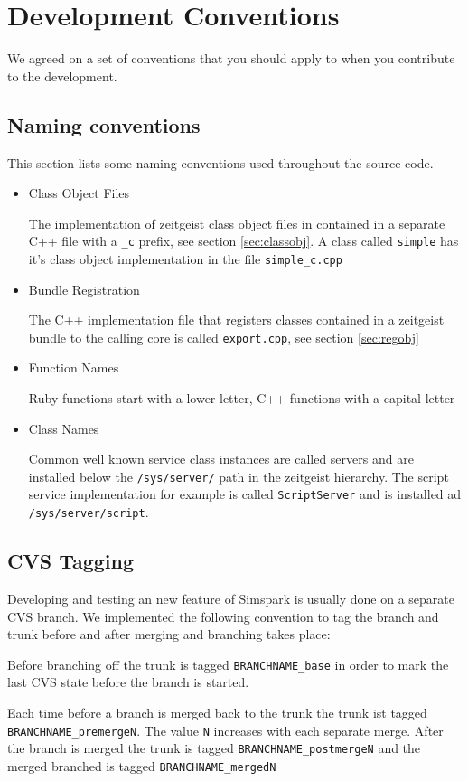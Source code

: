 \chapter{Development Conventions}

We agreed on a set of conventions that you should apply to when you
contribute to the development.

\section{Naming conventions}

This section lists some naming conventions used throughout the source
code.

\begin{itemize}

\item{Class Object Files}

The implementation of zeitgeist class object files in contained in a
separate C++ file with a \texttt{\_c} prefix, see section
\ref{sec:classobj}. A class called \texttt{simple} has it's class object
implementation in the file \texttt{simple\_c.cpp}

\item{Bundle Registration}

The C++ implementation file that registers classes contained in a
zeitgeist bundle to the calling core is called \texttt{export.cpp},
see section \ref{sec:regobj}

\item{Function Names}

Ruby functions start with a lower letter, C++ functions with a capital
letter

\item{Class Names}

Common well known service class instances are called servers and are
installed below the \texttt{/sys/server/} path in the zeitgeist
hierarchy. The script service implementation for example is called
\texttt{ScriptServer} and is installed ad \texttt{/sys/server/script}.

\end{itemize}

\section{CVS Tagging}

Developing and testing an new feature of Simspark is usually done on a
separate CVS branch. We implemented the following convention to tag
the branch and trunk before and after merging and branching takes
place:

Before branching off the trunk is tagged \texttt{BRANCHNAME\_base} in
order to mark the last CVS state before the branch is started.

Each time before a branch is merged back to the trunk the trunk ist tagged 
\texttt{BRANCHNAME\_premergeN}. The value \texttt{N} increases with each separate merge. 
After the branch is merged the trunk is tagged
\texttt{BRANCHNAME\_postmergeN} and the merged branched is tagged
\texttt{BRANCHNAME\_mergedN}


